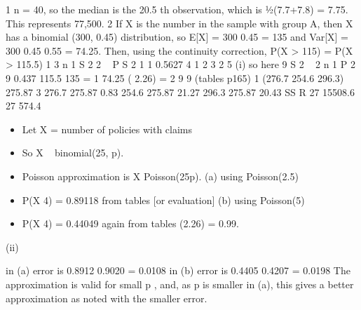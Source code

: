 \documentclass[a4paper,12pt]{article}
\begin{document}
\newpage
1 n = 40, so the median is the 20.5 th observation, which is 1⁄2(7.7+7.8) = 7.75.
This represents 77,500.
2 If X is the number in the sample with group A, then X has a binomial (300, 0.45)
distribution, so
E[X] = 300
0.45 = 135 and Var[X] = 300
0.45
0.55 = 74.25.
Then, using the continuity correction,
P(X > 115) = P(X > 115.5) 1
3
n 1 S 2
2
~
P S 2 1
1 0.5627
4
1
2
3
2
5
(i)
so here 9 S 2 ~
2
n 1
P
2
9
0.437
115.5 135
= 1
74.25
( 2.26) =
2
9
9
(tables p165)
1
(276.7 254.6 296.3) 275.87
3
276.7 275.87 0.83
254.6 275.87
21.27
296.3 275.87 20.43
SS R
27
15508.6
27
574.4
\begin{itemize}
\item Let X = number of policies with claims
\item So X ~ binomial(25, p).
\item Poisson approximation is X Poisson(25p).
(a) using Poisson(2.5)
\item P(X 4) = 0.89118 from tables [or evaluation]
(b) using Poisson(5)
\item P(X 4) = 0.44049 again from tables
(2.26) = 0.99.
\end{itemize}
(ii)

in (a) error is 0.8912 0.9020 = 0.0108
in (b) error is 0.4405 0.4207 = 0.0198
The approximation is valid for small p , and, as p is smaller in (a), this gives a better approximation as noted with the smaller error.
\end{document}

